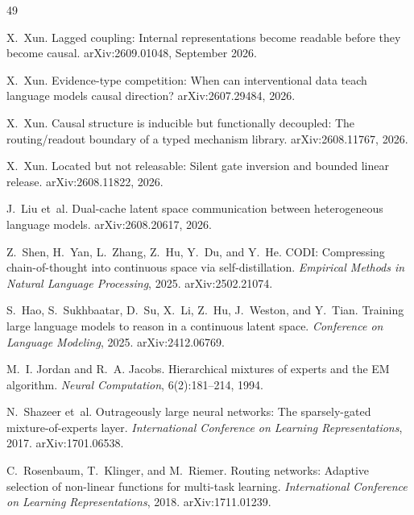 \documentclass[10pt,a4paper]{article}
\begin{document}
\clearpage
\begin{thebibliography}{49}
\footnotesize
\setlength{\itemsep}{0.15em}

X.~Xun.
Lagged coupling: Internal representations become readable before they become
causal.
arXiv:2609.01048, September 2026.

X.~Xun.
Evidence-type competition: When can interventional data teach language models
causal direction?
arXiv:2607.29484, 2026.

X.~Xun.
Causal structure is inducible but functionally decoupled: The routing/readout
boundary of a typed mechanism library.
arXiv:2608.11767, 2026.

X.~Xun.
Located but not releasable: Silent gate inversion and bounded linear release.
arXiv:2608.11822, 2026.

J.~Liu et~al.
Dual-cache latent space communication between heterogeneous language models.
arXiv:2608.20617, 2026.

Z.~Shen, H.~Yan, L.~Zhang, Z.~Hu, Y.~Du, and Y.~He.
CODI: Compressing chain-of-thought into continuous space via self-distillation.
\emph{Empirical Methods in Natural Language Processing}, 2025.
arXiv:2502.21074.

S.~Hao, S.~Sukhbaatar, D.~Su, X.~Li, Z.~Hu, J.~Weston, and Y.~Tian.
Training large language models to reason in a continuous latent space.
\emph{Conference on Language Modeling}, 2025.
arXiv:2412.06769.

M.~I. Jordan and R.~A. Jacobs.
Hierarchical mixtures of experts and the EM algorithm.
\emph{Neural Computation}, 6(2):181--214, 1994.

N.~Shazeer et~al.
Outrageously large neural networks: The sparsely-gated mixture-of-experts
layer.
\emph{International Conference on Learning Representations}, 2017.
arXiv:1701.06538.

C.~Rosenbaum, T.~Klinger, and M.~Riemer.
Routing networks: Adaptive selection of non-linear functions for multi-task
learning.
\emph{International Conference on Learning Representations}, 2018.
arXiv:1711.01239.


\end{thebibliography}
\end{document}

